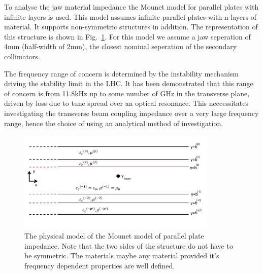 To analyse the jaw material impedance the Mounet model \cite{Mounet:Flat} for parallel plates with infinite layers is used. This model assumes infinite parallel plates with n-layers of material. It supports non-symmetric structures in addition. The representation of this structure is shown in Fig.~\ref{fig:mounet-model}. For this model we assume a jaw seperation of 4mm (half-width of 2mm), the closest nominal seperation of the secondary collimators.

The frequency range of concern is determined by the instability mechanism driving the stability limit in the LHC. It has been demonstrated that this range of concern is from 11.8kHz up to some number of GHz \cite{Métral:phase2Imp} in the transverse plane, driven by loss due to tune spread over an optical resonance. This neccessitates investigating the transverse beam coupling impedance over a very large frequency range, hence the choice of using an analytical method of investigation.

\begin{figure}
\begin{center}
\includegraphics[width=0.85\textwidth]{LHC_Collimation_Upgrades/figures/mounet-model.pdf}
\end{center}
\label{fig:mounet-model}
\caption{The physical model of the Mounet model of parallel plate impedance. Note that the two sides of the structure do not have to be symmetric. The materials maybe any material provided it's frequency dependent properties are well defined.}
\end{figure}

